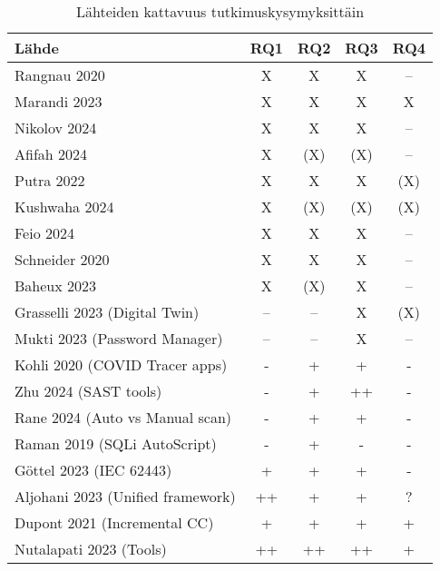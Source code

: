 \documentclass[bscthesis,finnish,oneside,biblatex]{uefcsthesis}
\begin{document}
\begin{table}[htbp]
  \centering
  \footnotesize
  \caption{Lähteiden kattavuus tutkimuskysymyksittäin}
  \label{tab:rq_matrix}
  \begin{tabular}{p{8cm}cccc}
    \toprule
    \textbf{Lähde} & \textbf{RQ1} & \textbf{RQ2} & \textbf{RQ3} & \textbf{RQ4} \\
    \midrule
    Rangnau 2020                                     & X   & X   & X   & --  \\
    Marandi 2023                                     & X   & X   & X   & X   \\
    Nikolov 2024                                     & X   & X   & X   & --  \\
    Afifah 2024                                      & X   & (X) & (X) & --  \\
    Putra 2022                                       & X   & X   & X   & (X) \\
    Kushwaha 2024                                    & X   & (X) & (X) & (X) \\
    Feio 2024                                        & X   & X   & X   & --  \\
    Schneider 2020                                   & X   & X   & X   & --  \\
    Baheux 2023                                      & X   & (X) & X   & --  \\
    Grasselli 2023 (Digital Twin)                    & --  & --  & X   & (X) \\
    Mukti 2023 (Password Manager)                    & --  & --  & X   & --  \\
    Kohli 2020 (COVID Tracer apps)                   &  -   &  +  &  +  &  -  \\
    Zhu 2024 (SAST tools)                            &  -   &  +  &  ++ &  -  \\
    Rane 2024 (Auto vs Manual scan)                  &  -   &  +  &  +  &  -  \\
    Raman 2019 (SQLi AutoScript)                     &  -   &  +  &  -  &  -  \\
    Göttel 2023 (IEC 62443)                          &  +   &  +  &  +  &  -  \\
    Aljohani 2023 (Unified framework)                &  ++  &  +  &  +  &  ?  \\
    Dupont 2021 (Incremental CC)                     &  +   &  +  &  +  &  +  \\
    Nutalapati 2023 (Tools)                          &  ++  &  ++ &  ++ &  +  \\

\end{tabular}
\end{table}
\end{document}
